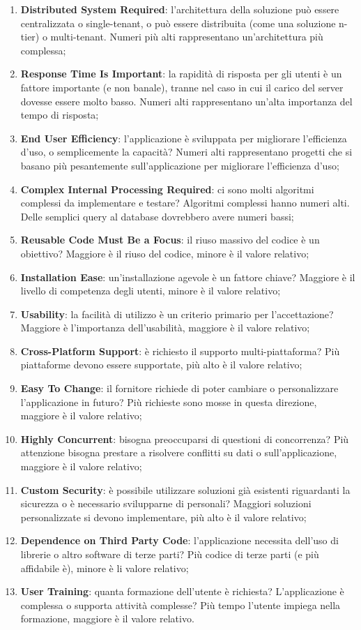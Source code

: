 \begin{enumerate}
	\item \textbf{Distributed System Required}: l'architettura della soluzione può essere centralizzata o single-tenant, o può essere distribuita (come una soluzione n-tier) o multi-tenant. Numeri più alti rappresentano un'architettura più complessa;
	\item \textbf{Response Time Is Important}: la rapidità di risposta per gli utenti è un fattore importante (e non banale), tranne nel caso in cui il carico del server dovesse essere molto basso. Numeri alti rappresentano un'alta importanza del tempo di risposta;
	\item \textbf{End User Efficiency}: l'applicazione è sviluppata per migliorare l'efficienza d'uso, o semplicemente la capacità? Numeri alti rappresentano progetti che si basano più pesantemente sull'applicazione per migliorare l'efficienza d'uso;
	\item \textbf{Complex Internal Processing Required}: ci sono molti algoritmi complessi da implementare e testare? Algoritmi complessi hanno numeri alti. Delle semplici query al database dovrebbero avere numeri bassi;
	\item \textbf{Reusable Code Must Be a Focus}: il riuso massivo del codice è un obiettivo? Maggiore è il riuso del codice, minore è il valore relativo;
	\item \textbf{Installation Ease}: un'installazione agevole è un fattore chiave? Maggiore è il livello di competenza degli utenti, minore è il valore relativo;
	\item \textbf{Usability}: la facilità di utilizzo è un criterio primario per l'accettazione? Maggiore è l'importanza dell'usabilità, maggiore è il valore relativo;
	\item \textbf{Cross-Platform Support}: è richiesto il supporto multi-piattaforma? Più piattaforme devono essere supportate, più alto è il valore relativo;
	\item \textbf{Easy To Change}: il fornitore richiede di poter cambiare o personalizzare l'applicazione in futuro? Più richieste sono mosse in questa direzione, maggiore è il valore relativo;
	\item \textbf{Highly Concurrent}: bisogna preoccuparsi di questioni di concorrenza? Più attenzione bisogna prestare a risolvere conflitti su dati o sull'applicazione, maggiore è il valore relativo;
	\item \textbf{Custom Security}: è possibile utilizzare soluzioni già esistenti riguardanti la sicurezza o è necessario svilupparne di personali? Maggiori soluzioni personalizzate si devono implementare, più alto è il valore relativo;
	\item \textbf{Dependence on Third Party Code}: l'applicazione necessita dell'uso di librerie o altro software di terze parti? Più codice di terze parti (e più affidabile è), minore è li valore relativo;
	\item \textbf{User Training}: quanta formazione dell'utente è richiesta? L'applicazione è complessa o supporta attività complesse? Più tempo l'utente impiega nella formazione, maggiore è il valore relativo. 
\end{enumerate}

